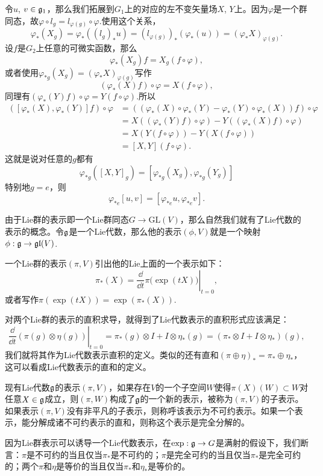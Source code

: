 令$u$, $v\in{\mathfrak{g}}_1$，那么我们拓展到$G_1$上的对应的左不变矢量场$X$, $Y$上。因为$\varphi$是一个群同态，故$\varphi\circ l_g=l_{\varphi(g)}\circ \varphi$.使用这个关系，
\[
	\varphi_{*}(X_g)=\varphi_{*}((l_g)_*u)=(l_{\varphi(g)})_*(\varphi_{*}(u))=(\varphi_{*}X)_{\varphi(g)}.
\]
设$f$是$G_2$上任意的可微实函数，那么
\[
\varphi_{*}(X_g)f=X_g(f\circ \varphi),
\]
或者使用$\varphi_{*g}(X_g)=(\varphi_{*}X)_{\varphi(g)}$写作
\[
(\varphi_{*}(X)f)\circ \varphi=X(f\circ \varphi),
\]
同理有$(\varphi_{*}(Y)f)\circ \varphi=Y(f\circ \varphi)$.所以
\[
	\begin{split}
		([\varphi_*(X),\varphi_*(Y)]f)\circ \varphi&=((\varphi_*(X)\circ\varphi_*(Y)-\varphi_*(Y)\circ\varphi_*(X))f)\circ \varphi\\
		&=X((\varphi_*(Y)f)\circ \varphi)-Y((\varphi_*(X)f)\circ \varphi)\\
		&=X(Y(f\circ \varphi))-Y(X(f\circ \varphi))\\
		&=[X,Y](f\circ \varphi).
	\end{split}
\]
这就是说对任意的$g$都有
\[
	\varphi_{*g}([X,Y]_g)=[\varphi_{*g}(X_g),\varphi_{*g}(Y_g)]
\]
特别地$g=e$，则
\[
	\varphi_{*e}[u,v]=[\varphi_{*e}u,\varphi_{*e}v].
\]

\para 由于Lie群的表示即一个Lie群同态$G\to \mathrm{GL}(V)$，那么自然我们就有了Lie代数的表示的概念。令${\mathfrak{g}}$是一个Lie代数，那么他的表示$(\phi,V)$就是一个映射$\phi:{\mathfrak{g}}\to\mathfrak{gl}(V)$.

一个Lie群的表示$(\pi,V)$引出他的Lie上面的一个表示如下：
\[
	\pi_*(X)=\left.\frac{\dd}{\dd t}\pi\bigl(\exp(tX)\bigr)\right|_{t=0},
\]
或者写作$\pi(\exp(tX))=\exp(\pi_*(X))$.

对两个Lie群的表示的直积求导，就得到了Lie代数表示的直积形式应该满足：
\[
	\left.\frac{\dd}{\dd t}(\pi(g)\otimes \eta(g))\right|_{t=0}=\pi_*(g)\otimes I+I\otimes \eta_*(g)=(\pi_*\otimes I+I\otimes \eta_*)(g),
\]
我们就将其作为Lie代数表示直积的定义。类似的还有直和$(\pi\oplus \eta)_*=\pi_*\oplus \eta_*$，这可以看成Lie代数表示的直和的定义。

\para 现有Lie代数${\mathfrak{g}}$的表示$(\pi,V)$，如果存在$V$的一个子空间$W$使得$\pi(X)(W)\subset W$对任意$X\in {\mathfrak{g}}$成立，则$(\pi,W)$构成了${\mathfrak{g}}$的一个新的表示，被称为$(\pi,V)$的子表示。如果表示$(\pi,V)$没有非平凡的子表示，则称呼该表示为不可约表示。如果一个表示，能分解成诸不可约表示的直和，则称这个表示是完全分解的。

\pro 因为Lie群表示可以诱导一个Lie代数表示，在$\exp:{\mathfrak{g}}\to G$是满射的假设下，我们断言：$\pi$是不可约的当且仅当$\pi_*$是不可约的；$\pi$是完全可约的当且仅当$\pi_*$是完全可约的；两个$\pi$和$\eta$是等价的当且仅当$\pi_*$和$\eta_*$是等价的。

